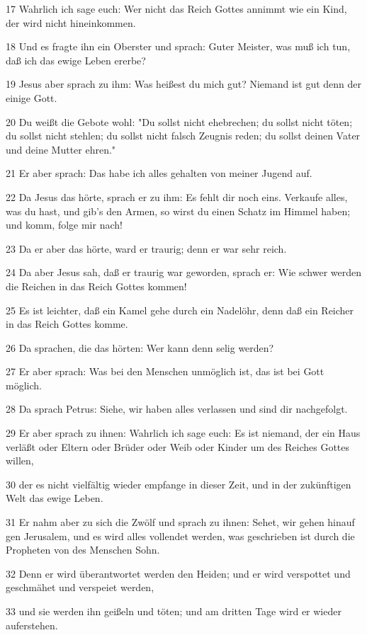 \par 17 Wahrlich ich sage euch: Wer nicht das Reich Gottes annimmt wie ein Kind, der wird nicht hineinkommen.
\par 18 Und es fragte ihn ein Oberster und sprach: Guter Meister, was muß ich tun, daß ich das ewige Leben ererbe?
\par 19 Jesus aber sprach zu ihm: Was heißest du mich gut? Niemand ist gut denn der einige Gott.
\par 20 Du weißt die Gebote wohl: "Du sollst nicht ehebrechen; du sollst nicht töten; du sollst nicht stehlen; du sollst nicht falsch Zeugnis reden; du sollst deinen Vater und deine Mutter ehren."
\par 21 Er aber sprach: Das habe ich alles gehalten von meiner Jugend auf.
\par 22 Da Jesus das hörte, sprach er zu ihm: Es fehlt dir noch eins. Verkaufe alles, was du hast, und gib's den Armen, so wirst du einen Schatz im Himmel haben; und komm, folge mir nach!
\par 23 Da er aber das hörte, ward er traurig; denn er war sehr reich.
\par 24 Da aber Jesus sah, daß er traurig war geworden, sprach er: Wie schwer werden die Reichen in das Reich Gottes kommen!
\par 25 Es ist leichter, daß ein Kamel gehe durch ein Nadelöhr, denn daß ein Reicher in das Reich Gottes komme.
\par 26 Da sprachen, die das hörten: Wer kann denn selig werden?
\par 27 Er aber sprach: Was bei den Menschen unmöglich ist, das ist bei Gott möglich.
\par 28 Da sprach Petrus: Siehe, wir haben alles verlassen und sind dir nachgefolgt.
\par 29 Er aber sprach zu ihnen: Wahrlich ich sage euch: Es ist niemand, der ein Haus verläßt oder Eltern oder Brüder oder Weib oder Kinder um des Reiches Gottes willen,
\par 30 der es nicht vielfältig wieder empfange in dieser Zeit, und in der zukünftigen Welt das ewige Leben.
\par 31 Er nahm aber zu sich die Zwölf und sprach zu ihnen: Sehet, wir gehen hinauf gen Jerusalem, und es wird alles vollendet werden, was geschrieben ist durch die Propheten von des Menschen Sohn.
\par 32 Denn er wird überantwortet werden den Heiden; und er wird verspottet und geschmähet und verspeiet werden,
\par 33 und sie werden ihn geißeln und töten; und am dritten Tage wird er wieder auferstehen.
